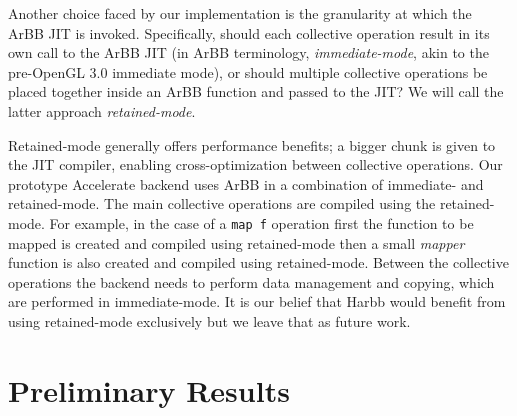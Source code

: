 \documentclass[conference]{IEEEtran}
\newcommand{\cde}[1]{{\footnotesize \tt #1}}
\newcommand{\textred}[1]{\textcolor{red}{#1}}
\newcommand{\pgwrapper}[2]{\textred{#1: #2}}
\newcommand{\textred}[1]{#1}
\newcommand{\pgwrapper}[2]{}
\newcommand{\rn}[1]{\pgwrapper{RRN}{#1}}
\newcommand{\systemname}[0]{{Harbb}}
\newcommand{\accarbb}[0]{\systemname{}}
\begin{document}


Another choice faced by our implementation is the granularity at which the
ArBB JIT is invoked.  Specifically, should each collective operation result in its
own call to the ArBB JIT (in ArBB terminology, {\em
  immediate-mode}, akin to the pre-OpenGL 3.0 immediate mode), or
should multiple collective operations be placed together
inside an ArBB function and passed to the JIT?
We will call the latter approach {\em retained-mode}.


Retained-mode generally offers performance benefits; a bigger 
chunk is given to the JIT compiler, enabling cross-optimization
between collective operations. 
Our prototype Accelerate backend uses 
ArBB in  
a combination of immediate- and retained-mode. The main collective 
operations are compiled using the retained-mode. For example, in the case 
of a \cde{map f}  operation first the function to be mapped is created and 
compiled using retained-mode then a small {\em mapper} function is 
also created and compiled using retained-mode. 
Between the collective operations the backend
needs to perform data management and copying, which 
are performed in immediate-mode. It is our belief that 
\systemname{} would benefit from using retained-mode exclusively 
but we leave that as future work. 





\section{Preliminary Results}
\end{document}
